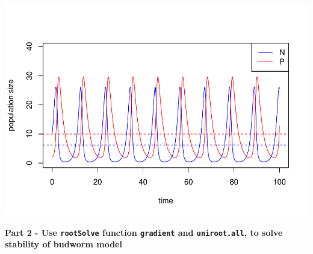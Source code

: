 \documentclass[
]{book}
\begin{document}
\includegraphics{bookdown-demo_files/figure-latex/unnamed-chunk-29-1.pdf}

\textbf{Part 2 - Use \texttt{rootSolve} function \texttt{gradient} and \texttt{uniroot.all}, to solve stability of budworm model}
\end{document}
